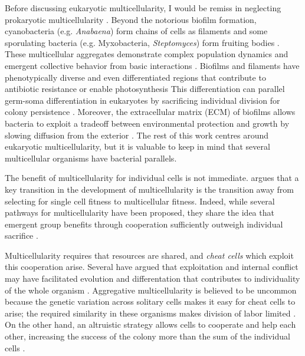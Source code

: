 Before discussing eukaryotic multicellularity, I would be remiss in neglecting prokaryotic multicellularity \citep{shapiro1988}. 
Beyond the notorious biofilm formation, cyanobacteria (e.g. \textit{Anabaena}) form chains of cells as filaments and some sporulating bacteria (e.g. Myxobacteria, \textit{Steptomyces}) form fruiting bodies \citep{claessen2014}.
These multicellular aggregates demonstrate complex population dynamics and emergent collective behavior from basic interactions \citep{lopez2010,welch2001,zhang2012}.
Biofilms and filaments have phenotypically diverse and even differentiated regions that contribute to antibiotic resistance \citep{stewart2008} or enable photosynthesis \citep{flores2010}
This differentiation can parallel germ-soma differentiation in eukaryotes by sacrificing individual division for colony persistence \citep{lewis2010,wilcox1973}.
Moreover, the extracellular matrix (ECM) of biofilms allows bacteria to exploit a tradeoff between environmental protection and growth by slowing diffusion from the exterior \citep{mah2001,rittmann1980}.
The rest of this work centres around eukaryotic multicellularity, but it is valuable to keep in mind that several multicellular organisms have bacterial parallels.

The benefit of multicellularity for individual cells is not immediate.
\citet{michod2003} argues that a key transition in the development of multicellularity is the transition away from selecting for single cell fitness to multicellular fitness. 
Indeed, while several pathways for multicellularity have been proposed, they share the idea that emergent group benefits through cooperation sufficiently outweigh individual sacrifice \citep{michod2001}.

Multicellularity requires that resources are shared, and \textit{cheat cells} which exploit this cooperation arise.
Several have argued that exploitation and internal conflict may have facilitated evolution and differentation that contributes to individuality of the whole organism \citep{michod2001,rainey2010,hammerschmidt2014,grosberg2007}.
Aggregative multicellularity is believed to be uncommon because the genetic variation across solitary cells makes it easy for cheat cells to arise; the required similarity in these organisms makes division of labor limited \citep{brunet2017}.
On the other hand, an altruistic strategy allows cells to cooperate and help each other, increasing the success of the colony more than the sum of the individual cells \citep{michod2006,gulli2019}.


